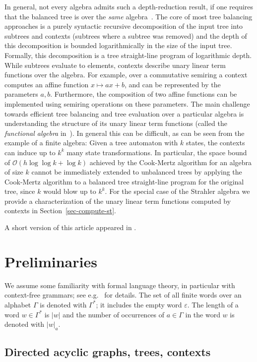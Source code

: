 \documentclass[a4paper,UKenglish,cleveref, autoref, thm-restate, numberwithinsect]{lipics-v2021}
\begin{document}
In general, not every algebra admits such a depth-reduction result,
if one requires that the balanced tree is over the \emph{same} algebra~\cite[Theorem~1]{Kosaraju90}.
The core of most tree balancing approaches is a purely syntactic recursive decomposition of the input tree into subtrees
and contexts (subtrees where a subtree was removed) and the depth of this decomposition is bounded logarithmically
in the size of the input tree. Formally, this decomposition is
a tree straight-line program of logarithmic depth.
While subtrees evaluate to elements, contexts describe unary linear term functions over the algebra.
For example, over a commutative semiring a context computes an affine function $x \mapsto ax+b$,
and can be represented by the parameters $a,b$.
Furthermore, the composition of two affine functions can be implemented using semiring operations on these parameters.
The main challenge towards efficient tree balancing and tree evaluation over a particular algebra
is understanding the structure of its unary linear term functions (called the \emph{functional algebra} in~\cite{KrebsLL17}).
In general this can be difficult, as can be seen from the example of a finite algebra:
Given a tree automaton with $k$ states, the contexts can induce up to $k^k$ many state transformations.
In particular, the space bound of $\mathcal{O}(h \log \log k + \log k)$ achieved by the Cook-Mertz algorithm for an algebra of size $k$
cannot be immediately extended to unbalanced trees by applying the Cook-Mertz algorithm to a balanced tree straight-line program 
for the original tree, since $k$ would blow up to $k^k$.
For the special case of the Strahler algebra we provide a characterization of the unary linear term functions computed by contexts
in Section~\ref{sec-compute-st}.

A short version of this article appeared in \cite{GanardiL26}.
 
\section{Preliminaries} 

We assume some familiarity with formal language theory, in particular with context-free grammars; see e.g.~\cite{HoUl79} for details.
The set of all finite words over an alphabet $\Gamma$ is denoted with $\Gamma^*$; it includes the 
empty word $\varepsilon$. The length of a word $w \in \Gamma^*$ is $|w|$ and the number of occurrences
of $a \in \Gamma$ in the word $w$ is denoted with $|w|_a$.

\subsection{Directed acyclic graphs, trees, contexts}  \label{sec-dags-trees}
\end{document}
